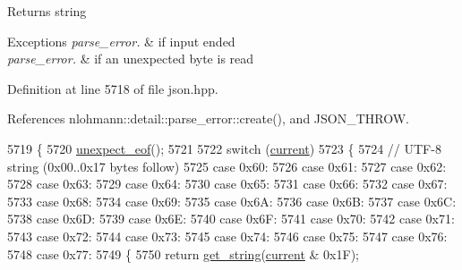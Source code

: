 \begin{DoxyReturn}{Returns}
string
\end{DoxyReturn}

\begin{DoxyExceptions}{Exceptions}
{\em parse\+\_\+error.} & if input ended \\
\hline
{\em parse\+\_\+error.} & if an unexpected byte is read \\
\hline
\end{DoxyExceptions}


Definition at line 5718 of file json.\+hpp.



References nlohmann\+::detail\+::parse\+\_\+error\+::create(), and J\+S\+O\+N\+\_\+\+T\+H\+R\+OW.


\begin{DoxyCode}
5719     \{
5720         \hyperlink{classnlohmann_1_1detail_1_1binary__reader_a1dfc55484af3a896c376b41cd99f3e15}{unexpect\_eof}();
5721 
5722         \textcolor{keywordflow}{switch} (\hyperlink{classnlohmann_1_1detail_1_1binary__reader_a7e994e201b215cd6d6ae28a1853f43e0}{current})
5723         \{
5724             \textcolor{comment}{// UTF-8 string (0x00..0x17 bytes follow)}
5725             \textcolor{keywordflow}{case} 0x60:
5726             \textcolor{keywordflow}{case} 0x61:
5727             \textcolor{keywordflow}{case} 0x62:
5728             \textcolor{keywordflow}{case} 0x63:
5729             \textcolor{keywordflow}{case} 0x64:
5730             \textcolor{keywordflow}{case} 0x65:
5731             \textcolor{keywordflow}{case} 0x66:
5732             \textcolor{keywordflow}{case} 0x67:
5733             \textcolor{keywordflow}{case} 0x68:
5734             \textcolor{keywordflow}{case} 0x69:
5735             \textcolor{keywordflow}{case} 0x6A:
5736             \textcolor{keywordflow}{case} 0x6B:
5737             \textcolor{keywordflow}{case} 0x6C:
5738             \textcolor{keywordflow}{case} 0x6D:
5739             \textcolor{keywordflow}{case} 0x6E:
5740             \textcolor{keywordflow}{case} 0x6F:
5741             \textcolor{keywordflow}{case} 0x70:
5742             \textcolor{keywordflow}{case} 0x71:
5743             \textcolor{keywordflow}{case} 0x72:
5744             \textcolor{keywordflow}{case} 0x73:
5745             \textcolor{keywordflow}{case} 0x74:
5746             \textcolor{keywordflow}{case} 0x75:
5747             \textcolor{keywordflow}{case} 0x76:
5748             \textcolor{keywordflow}{case} 0x77:
5749             \{
5750                 \textcolor{keywordflow}{return} \hyperlink{classnlohmann_1_1detail_1_1binary__reader_a195b573a807da6d5841a898c6f74e03c}{get\_string}(\hyperlink{classnlohmann_1_1detail_1_1binary__reader_a7e994e201b215cd6d6ae28a1853f43e0}{current} & 0x1F);

\end{DoxyCode}
